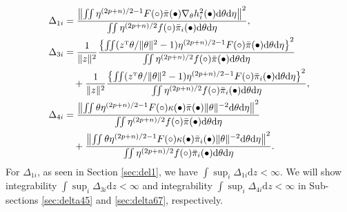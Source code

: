 \documentclass[preprint,11pt]{imsart}
\numberwithin{equation}{section}
\theoremstyle{plain}
\theoremstyle{definition}
\theoremstyle{remark}
\def\T{{ \mathrm{\scriptscriptstyle T} }}
\newcommand{\rd}{\mathrm{d}}
\begin{document}
\begin{align}
 \Delta_{1i}
& =
\frac{\left\| \iint   \eta^{(2p+n)/2-1} F(\circ) 
\bar{\pi}(\bullet)\nabla_\theta h_i^2(\bullet) \rd \theta   \rd \eta\right\|^2}{\iint\eta^{(2p+n)/2} f(\circ) 
\bar{\pi}_i(\bullet) \rd \theta   \rd \eta }, \notag \\
 \Delta_{3i}
& =
 \frac{1}{\|z\|^2}
 \frac{\left\{\iint 
(z^\T\theta/\|\theta\|^2-1) \eta^{(2p+n)/2-1} F(\circ) 
\bar{\pi}(\bullet) \rd \theta   \rd \eta\right\}^2}{\iint \eta^{(2p+n)/2} f(\circ) 
 \bar{\pi}(\bullet) \rd \theta   \rd \eta} \notag\\ 
& \quad +
 \frac{1}{\|z\|^2}
 \frac{\left\{\iint 
(z^\T\theta/\|\theta\|^2-1) \eta^{(2p+n)/2-1} F(\circ) 
\bar{\pi}_i(\bullet) \rd \theta   \rd \eta\right\}^2}{\iint \eta^{(2p+n)/2} f(\circ) 
 \bar{\pi}_i(\bullet) \rd \theta   \rd \eta}, \label{eq:deldel5}\\
 \Delta_{4i}
 &=
 \frac{\left\| \iint  \theta\eta^{(2p+n)/2-1} F(\circ) \kappa(\bullet)\bar{\pi}(\bullet)\|\theta\|^{-2} \rd \theta  \rd \eta\right\|^2}{\iint\eta^{(2p+n)/2} f(\circ) 
\bar{\pi}(\bullet) \rd \theta   \rd \eta } \notag\\ 
 &\quad +
 \frac{\left\| \iint  \theta\eta^{(2p+n)/2-1} F(\circ) \kappa(\bullet)\bar{\pi}_i(\bullet)\|\theta\|^{-2} \rd \theta  \rd \eta\right\|^2}{\iint\eta^{(2p+n)/2} f(\circ) 
\bar{\pi}_i(\bullet) \rd \theta   \rd \eta }. \label{eq:deldel7}
\end{align}
For $\Delta_{1i}$, as seen in Section \ref{sec:del1},
we have $\int \sup_i\Delta_{1i}\rd z<\infty$.
We will show integrability $\int \sup_i\Delta_{3i}\rd z<\infty$ 
and integrability $\int \sup_i\Delta_{4i}\rd z<\infty$ in Sub-sections
\ref{sec:delta45} and \ref{sec:delta67}, respectively.
 
\end{document}
